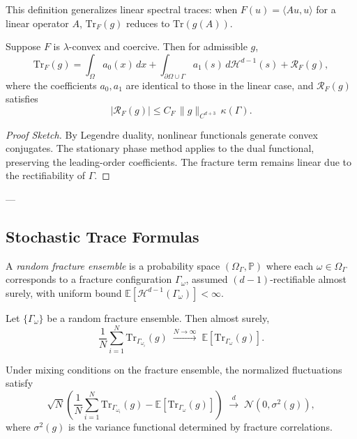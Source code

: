 \begin{remark}
This definition generalizes linear spectral traces:  
when $F(u) = \langle Au,u\rangle$ for a linear operator $A$,  
$\mathrm{Tr}_F(g)$ reduces to $\mathrm{Tr}(g(A))$.
\end{remark}

\begin{theorem}
\label{thm:nonlinear-trace}
Suppose $F$ is $\lambda$-convex and coercive.  
Then for admissible $g$,  
\[
\mathrm{Tr}_F(g) = \int_\Omega a_0(x)\,dx 
+ \int_{\partial\Omega \cup \Gamma} a_1(s)\,d\mathcal{H}^{d-1}(s) 
+ \mathcal{R}_F(g),
\]
where the coefficients $a_0, a_1$ are identical to those in the linear case,  
and $\mathcal{R}_F(g)$ satisfies
\[
|\mathcal{R}_F(g)| \leq C_F \, \|g\|_{C^{d+3}} \, \kappa(\Gamma).
\]
\end{theorem}

\begin{proof}[Proof Sketch]
By Legendre duality, nonlinear functionals generate convex conjugates.  
The stationary phase method applies to the dual functional,  
preserving the leading-order coefficients.  
The fracture term remains linear due to the rectifiability of $\Gamma$.  
\end{proof}

---

\subsection{Stochastic Trace Formulas}

\begin{definition}
A \emph{random fracture ensemble} is a probability space $(\Omega_\Gamma, \mathbb{P})$  
where each $\omega \in \Omega_\Gamma$ corresponds to a fracture configuration $\Gamma_\omega$,  
assumed $(d-1)$-rectifiable almost surely,  
with uniform bound $\mathbb{E}[\mathcal{H}^{d-1}(\Gamma_\omega)] < \infty$.
\end{definition}

\begin{theorem}
\label{thm:stochastic-LLN}
Let $\{ \Gamma_\omega \}$ be a random fracture ensemble.  
Then almost surely,
\[
\frac{1}{N} \sum_{i=1}^N \mathrm{Tr}_{\Gamma_{\omega_i}}(g) 
\;\xrightarrow{N\to\infty}\; 
\mathbb{E}[\mathrm{Tr}_{\Gamma_\omega}(g)].
\]
\end{theorem}

\begin{theorem}
\label{thm:stochastic-CLT}
Under mixing conditions on the fracture ensemble,  
the normalized fluctuations satisfy
\[
\sqrt{N} \left(
\frac{1}{N} \sum_{i=1}^N \mathrm{Tr}_{\Gamma_{\omega_i}}(g) 
- \mathbb{E}[\mathrm{Tr}_{\Gamma_\omega}(g)]
\right) \;\xrightarrow{d}\; \mathcal{N}(0,\sigma^2(g)),
\]
where $\sigma^2(g)$ is the variance functional determined by fracture correlations.
\end{theorem}

